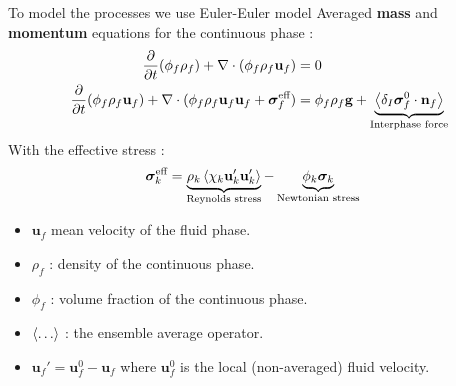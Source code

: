 \documentclass{sintefbeamer}
\begin{document}
\begin{frame}{To model the processes we use Euler-Euler model }
  Averaged \textbf{mass} and \textbf{momentum} equations for the continuous phase :
\begin{align*}
  \frac{\partial}{\partial t} (\phi_f \rho_f)  
  + \mathbf{\nabla}\cdot (\phi_f \rho_f\textbf{u}_f)
  &= 
  0\\
  \frac{\partial}{\partial t} (\phi_f \rho_f\textbf{u}_f)  
  + \mathbf{\nabla}\cdot (
      \phi_f \rho_f\textbf{u}_f\textbf{u}_f
      + \bm{\sigma}_f^\text{eff}
  )
  &= 
  \phi_f  \rho_f \textbf{g}
  + 
  \underbrace{
    \left<\delta_I \bm{\sigma}_f^0 \cdot \textbf{n}_f\right>
  }_\text{Interphase force}
\end{align*}
With the effective stress : 
\begin{align*}
  &\bm{\sigma}_k^\text{eff}
  = 
   \underbrace{\rho_k\left<\chi_k \textbf{u}_k'\textbf{u}_k'\right>}_\text{Reynolds stress}
    - \underbrace{\phi_k \bm{\sigma}_k}_\text{Newtonian stress}
\end{align*}
\begin{itemize}
  \item $\textbf{u}_f$ mean velocity of the fluid phase.  
  \item $\rho_f$ : density of the continuous phase. 
  \item $\phi_f$ : volume fraction of the continuous phase. 
  \item $\left<\ldots\right>$ : the ensemble average operator. 
  \item $\textbf{u}_f' = \textbf{u}^0_f - \textbf{u}_f$ where $\textbf{u}_f^0$ is the local (non-averaged) fluid velocity. 
\end{itemize}
\end{frame}
\end{document}
